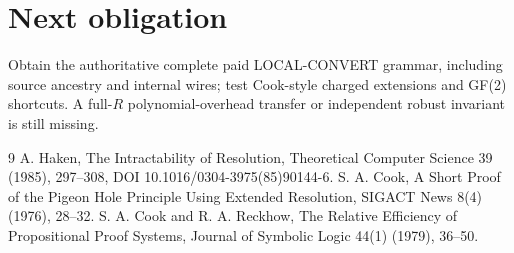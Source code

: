 \documentclass[11pt]{article}
\begin{document}
\section*{Next obligation}
Obtain the authoritative complete paid LOCAL-CONVERT grammar, including source ancestry and internal wires; test Cook-style charged extensions and GF(2) shortcuts. A full-$R$ polynomial-overhead transfer or independent robust invariant is still missing.

\begin{thebibliography}{9}
 A. Haken, The Intractability of Resolution, Theoretical Computer Science 39 (1985), 297--308, DOI 10.1016/0304-3975(85)90144-6.
 S. A. Cook, A Short Proof of the Pigeon Hole Principle Using Extended Resolution, SIGACT News 8(4) (1976), 28--32.
 S. A. Cook and R. A. Reckhow, The Relative Efficiency of Propositional Proof Systems, Journal of Symbolic Logic 44(1) (1979), 36--50.
\end{thebibliography}
\end{document}
